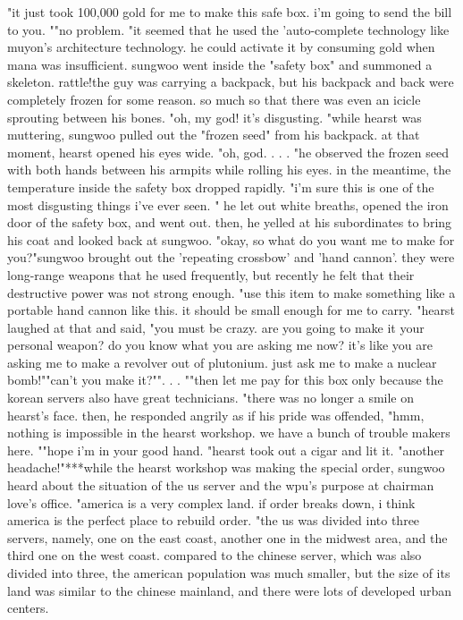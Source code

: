 "it just took 100,000 gold for me to make this safe box.
 i'm going to send the bill to you.
""no problem.
"it seemed that he used the 'auto-complete technology like muyon's architecture technology.
 he could activate it by consuming gold when mana was insufficient.
sungwoo went inside the "safety box" and summoned a skeleton.
rattle!the guy was carrying a backpack, but his backpack and back were completely frozen for some reason.
 so much so that there was even an icicle sprouting between his bones.
"oh, my god! it's disgusting.
"while hearst was muttering, sungwoo pulled out the "frozen seed" from his backpack.
at that moment, hearst opened his eyes wide.
 "oh, god.
.
.
.
"he observed the frozen seed with both hands between his armpits while rolling his eyes.
 in the meantime, the temperature inside the safety box dropped rapidly.
"i'm sure this is one of the most disgusting things i've ever seen.
"
he let out white breaths, opened the iron door of the safety box, and went out.
 then, he yelled at his subordinates to bring his coat and looked back at sungwoo.
 "okay, so what do you want me to make for you?"sungwoo brought out the 'repeating crossbow' and 'hand cannon'.
 they were long-range weapons that he used frequently, but recently he felt that their destructive power was not strong enough.
 "use this item to make something like a portable hand cannon like this.
 it should be small enough for me to carry.
"hearst laughed at that and said, "you must be crazy.
 are you going to make it your personal weapon? do you know what you are asking me now? it's like you are asking me to make a revolver out of plutonium.
 just ask me to make a nuclear bomb!""can't you make it?"".
.
.
""then let me pay for this box only because the korean servers also have great technicians.
"there was no longer a smile on hearst's face.
 then, he responded angrily as if his pride was offended, "hmm, nothing is impossible in the hearst workshop.
 we have a bunch of trouble makers here.
""hope i'm in your good hand.
"hearst took out a cigar and lit it.
 "another headache!"***while the hearst workshop was making the special order, sungwoo heard about the situation of the us server and the wpu's purpose at chairman love's office.
"america is a very complex land.
 if order breaks down, i think america is the perfect place to rebuild order.
"the us was divided into three servers, namely, one on the east coast, another one in the midwest area, and the third one on the west coast.
compared to the chinese server, which was also divided into three, the american population was much smaller, but the size of its land was similar to the chinese mainland, and there were lots of developed urban centers.
